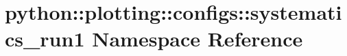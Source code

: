 \hypertarget{namespacepython_1_1plotting_1_1configs_1_1systematics__run1}{
\section{python::plotting::configs::systematics\_\-run1 Namespace Reference}
\label{namespacepython_1_1plotting_1_1configs_1_1systematics__run1}
}
